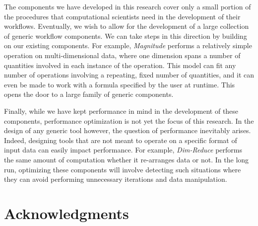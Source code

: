 \documentclass[conference]{IEEEtran}
\begin{document}
The components we have developed in this research cover only a small portion of
the procedures that computational scientists need in the development of their
workflows. Eventually, we wish to allow for the development of a large
collection of generic workflow components. We can take steps in this direction
by building on our existing components. For example, {\em Magnitude} performs a
relatively simple operation on multi-dimensional data, where one dimension
spans a number of quantities involved in each instance of the operation. This
model can fit any number of operations involving a repeating, fixed number of
quantities, and it can even be made to work with a formula specified by the
user at runtime. This opens the door to a large family of generic components.

Finally, while we have kept performance in mind in the development of these
components, performance optimization is not yet the focus of this research. In
the design of any generic tool however, the question of performance inevitably
arises. Indeed, designing tools that are not meant to operate on a specific
format of input data can easily impact performance. For example, {\em
Dim-Reduce} performs the same amount of computation whether it re-arranges data
or not. In the long run, optimizing these components will involve detecting
such situations where they can avoid performing unnecessary iterations and data
manipulation.

\section*{Acknowledgments}
\end{document}
